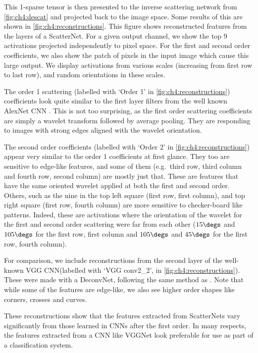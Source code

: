 This 1-sparse tensor is then presented to the inverse scattering network from
\autoref{fig:ch4:descat} and projected back to the image space. Some results of this
are shown in \autoref{fig:ch4:reconstructions}. This figure shows reconstructed
features from the layers of a ScatterNet. For a given output channel, we show
the top 9 activations projected independently to pixel space. For the first and
second order coefficients, we also show the patch of pixels in the input image
which cause this large output. We display activations from various scales
(increasing from first row to last row), and random orientations in these
scales. 

The order 1 scattering (labelled with `Order 1' in
\autoref{fig:ch4:reconstructions}) coefficients look quite similar to the first
layer filters from the well known AlexNet CNN \cite{krizhevsky_imagenet_2012}.
This is not too surprising, as the first order scattering coefficients are
simply a wavelet transform followed by average pooling. They are responding to
images with strong edges aligned with the wavelet orientation. 

The second order coefficients (labelled with `Order
2' in \autoref{fig:ch4:reconstructions}) appear very similar to the order
1 coefficients at first glance.
They too are sensitive to edge-like features, and some of them (e.g.\ third row,
third column and fourth row, second column) are mostly just that. These are
features that have the same oriented wavelet applied at both the first and
second order.  Others, such as the nine in the top left square (first row, first column), 
and top right square (first row, fourth column) are more sensitive to
checker-board like patterns. Indeed, these are activations where the orientation
of the wavelet for the first and second order scattering were far from each
other ($15\degs$ and $105\degs$ for the first row, first column and $105\degs$
and $45\degs$ for the first row, fourth column).

For comparison, we include reconstructions from the second layer of the
well-known VGG CNN\@ (labelled with `VGG conv2\_2', in
\autoref{fig:ch4:reconstructions}). These were made with a DeconvNet, following the
same method as \cite{zeiler_visualizing_2014}. Note that while some of
the features are edge-like, we also see higher order shapes like corners,
crosses and curves.

These reconstructions show that the features extracted from ScatterNets vary
significantly from those learned in CNNs after the first order. In many
respects, the features extracted from a CNN like VGGNet look preferable for use
as part of a classification system.

